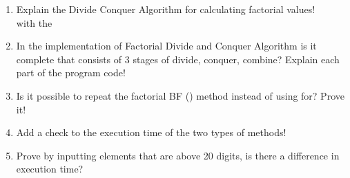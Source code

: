 \documentclass[12pt,titlepage]{article}
\begin{document}
\begin{enumerate}
    \item Explain the Divide Conquer Algorithm for calculating factorial values!
    \mbox{}\\ with the 
    \item In the implementation of Factorial Divide and Conquer Algorithm is it complete that consists of 3 stages of divide, conquer, combine? Explain each part of the program code!
    \item Is it possible to repeat the factorial BF () method instead of using for? Prove it!
    \item Add a check to the execution time of the two types of methods!
    \item Prove by inputting elements that are above 20 digits, is there a difference in execution time?
\end{enumerate}
\end{document}

